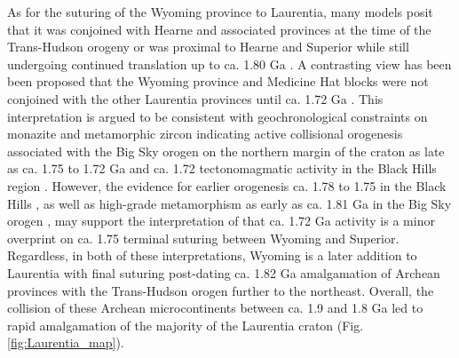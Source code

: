 \documentclass[11pt,letterpaper]{article}
\begin{document}
As for the suturing of the Wyoming province to Laurentia, many models posit that it was conjoined with Hearne and associated provinces at the time of the Trans-Hudson orogeny \citep[e.g.][]{St-Onge2009a, Pehrsson2015a} or was proximal to Hearne and Superior while still undergoing continued translation up to ca. 1.80 Ga \citep{Whitmeyer2007a}. A contrasting view has been been proposed that the Wyoming province and Medicine Hat blocks were not conjoined with the other Laurentia provinces until ca. 1.72 Ga \citep{Kilian2016b}. This interpretation is argued to be consistent with geochronological constraints on monazite and metamorphic zircon indicating active collisional orogenesis associated with the Big Sky orogen on the northern margin of the craton as late as ca. 1.75 to 1.72 Ga \citep{Condit2015a} and ca. 1.72 tectonomagmatic activity in the Black Hills region \citep{Redden1990a}. However, the evidence for earlier orogenesis ca. 1.78 to 1.75 in the Black Hills \citep{Dahl1999a,Hrncir2017a}, as well as high-grade metamorphism as early as ca. 1.81 Ga in the Big Sky orogen \citep{Condit2015a}, may support the interpretation of \citet{Hrncir2017a} that ca. 1.72 Ga activity is a minor overprint on ca. 1.75 terminal suturing between Wyoming and Superior. Regardless, in both of these interpretations, Wyoming is a later addition to Laurentia with final suturing post-dating ca. 1.82 Ga amalgamation of Archean provinces with the Trans-Hudson orogen further to the northeast. Overall, the collision of these Archean microcontinents between ca. 1.9 and 1.8 Ga led to rapid amalgamation of the majority of the Laurentia craton (Fig. \ref{fig:Laurentia_map}).
\end{document}
